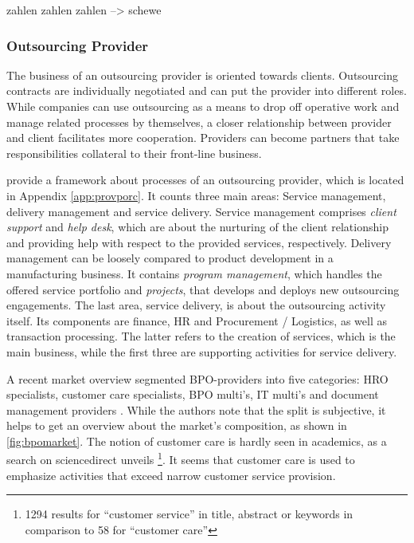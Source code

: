 		zahlen zahlen zahlen --> schewe
	
		\subsubsection{Outsourcing Provider}
		
		The business of an outsourcing provider is oriented towards clients. Outsourcing contracts are individually negotiated and can put the provider into different roles. While companies can use outsourcing as a means to drop off operative work and manage related processes by themselves, a closer relationship between provider and client facilitates more cooperation. Providers can become partners that take responsibilities collateral to their front-line business. 
		
		\cite{schewe2007} provide a framework about processes of an outsourcing provider, which is located in Appendix \ref{app:provporc}. It counts three main areas: Service management, delivery management and service delivery. Service management comprises \textit{client support} and \textit{help desk}, which are about the nurturing of the client relationship and providing help with respect to the provided services, respectively. Delivery management can be loosely compared to product development in a manufacturing business. It contains \textit{program management}, which handles the offered service portfolio and \textit{projects}, that develops and deploys new outsourcing engagements. The last area, service delivery, is about the outsourcing activity itself. Its components are finance, HR and Procurement / Logistics, as well as transaction processing. The latter refers to the creation of services, which is the main business, while the first three are supporting activities for service delivery. 
			
		A recent market overview segmented BPO-providers into five categories: \acrfull{HRO} specialists, customer care specialists, BPO multi's, IT multi's and document management providers \citep{hfs2016top}.  While the authors note that the split is subjective, it helps to get an overview about the market's composition, as shown in \Fig \ref{fig:bpomarket}. The notion of customer care is hardly seen in academics, as a search on sciencedirect unveils \footnote{1294 results for \enquote{customer service} in title, abstract or keywords in comparison to 58 for \enquote{customer care}}. It seems that customer care is used to emphasize activities that exceed narrow customer service provision. 		
			
